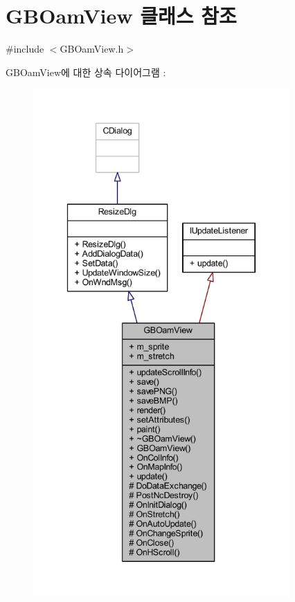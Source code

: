 \hypertarget{class_g_b_oam_view}{}\section{G\+B\+Oam\+View 클래스 참조}
\label{class_g_b_oam_view}


{\ttfamily \#include $<$G\+B\+Oam\+View.\+h$>$}



G\+B\+Oam\+View에 대한 상속 다이어그램 \+: \nopagebreak
\begin{figure}[H]
\begin{center}
\leavevmode
\includegraphics[height=550pt]{class_g_b_oam_view__inherit__graph}
\end{center}
\end{figure}


